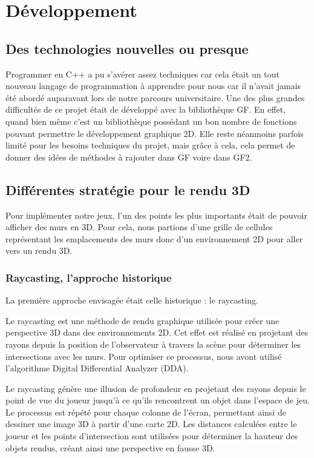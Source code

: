 \documentclass[12pt]{report}
\begin{document}
\section{Développement}
\subsection{Des technologies nouvelles ou presque}
Programmer en C++ a pu s'avérer assez techniques car cela était un tout nouveau langage de programmation à apprendre pour nous car il n'avait jamais été abordé auparavant lors de notre parcours universitaire.
Une des plus grandes difficultés de ce projet était de développé avec la bibliothèque GF. En effet, quand bien même c'est un bibliothèque possédant un bon nombre de fonctions pouvant permettre le développement graphique 2D. Elle reste néanmoins parfois limité pour les besoins techniques du projet, mais grâce à cela, cela permet de donner des idées de méthodes à rajouter dans GF voire dans GF2.\cite{GF2}

\subsection{Différentes stratégie pour le rendu 3D}
Pour implémenter notre jeux, l'un des points les plus importants était de pouvoir afficher des murs en 3D. Pour cela, nous partions d'une grille de cellules 
représentant les emplacements des murs donc d'un environnement 2D pour aller vers un rendu 3D.
\subsubsection{Raycasting, l'approche historique}
La première approche envisagée était celle historique : le raycasting.

Le raycasting est une méthode de rendu graphique utilisée pour créer une perspective 3D dans des environnements 2D. Cet effet est réalisé en projetant des 
rayons depuis la position de l'observateur à travers la scène pour déterminer les intersections avec les murs. Pour optimiser ce
processus, nous avont utilisé l'algorithme Digital Differential Analyzer (DDA).

Le raycasting génère une illusion de profondeur en projetant des rayons depuis le point de vue du joueur jusqu'à ce qu'ils rencontrent un 
objet dans l'espace de jeu. Le processus est répété pour chaque colonne de l'écran, permettant ainsi de dessiner une image 3D à partir d'une
carte 2D. Les distances calculées entre le joueur et les points d'intersection sont utilisées pour déterminer la hauteur des objets rendus, 
créant ainsi une perspective en fausse 3D.
\end{document}
